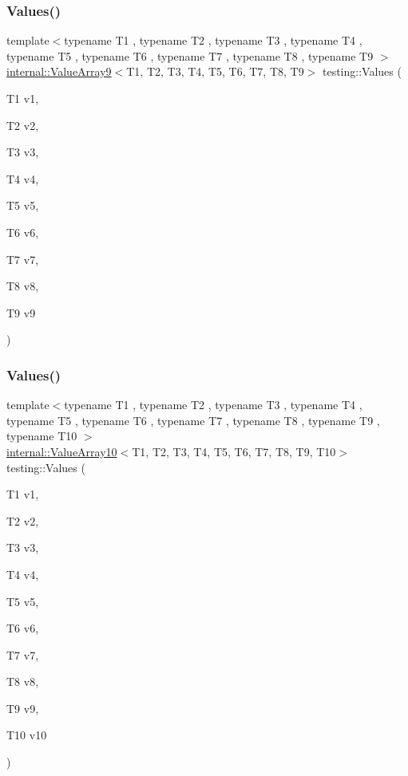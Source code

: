 \mbox{\label{namespacetesting_ab663e13807ad5cc223814797c9191a58}} 
\subsubsection{\texorpdfstring{Values()}{Values()}\hspace{0.1cm}{\footnotesize\ttfamily [10/51]}}
{\footnotesize\ttfamily template$<$typename T1 , typename T2 , typename T3 , typename T4 , typename T5 , typename T6 , typename T7 , typename T8 , typename T9 $>$ \\
\mbox{\hyperlink{classtesting_1_1internal_1_1_value_array9}{internal\+::\+Value\+Array9}}$<$T1, T2, T3, T4, T5, T6, T7, T8, T9$>$ testing\+::\+Values (\begin{DoxyParamCaption}\item[{T1}]{v1,  }\item[{T2}]{v2,  }\item[{T3}]{v3,  }\item[{T4}]{v4,  }\item[{T5}]{v5,  }\item[{T6}]{v6,  }\item[{T7}]{v7,  }\item[{T8}]{v8,  }\item[{T9}]{v9 }\end{DoxyParamCaption})}

\mbox{\label{namespacetesting_a2948b0215fce80155fdbad4e3608f4cd}} 
\subsubsection{\texorpdfstring{Values()}{Values()}\hspace{0.1cm}{\footnotesize\ttfamily [11/51]}}
{\footnotesize\ttfamily template$<$typename T1 , typename T2 , typename T3 , typename T4 , typename T5 , typename T6 , typename T7 , typename T8 , typename T9 , typename T10 $>$ \\
\mbox{\hyperlink{classtesting_1_1internal_1_1_value_array10}{internal\+::\+Value\+Array10}}$<$T1, T2, T3, T4, T5, T6, T7, T8, T9, T10$>$ testing\+::\+Values (\begin{DoxyParamCaption}\item[{T1}]{v1,  }\item[{T2}]{v2,  }\item[{T3}]{v3,  }\item[{T4}]{v4,  }\item[{T5}]{v5,  }\item[{T6}]{v6,  }\item[{T7}]{v7,  }\item[{T8}]{v8,  }\item[{T9}]{v9,  }\item[{T10}]{v10 }\end{DoxyParamCaption})}

